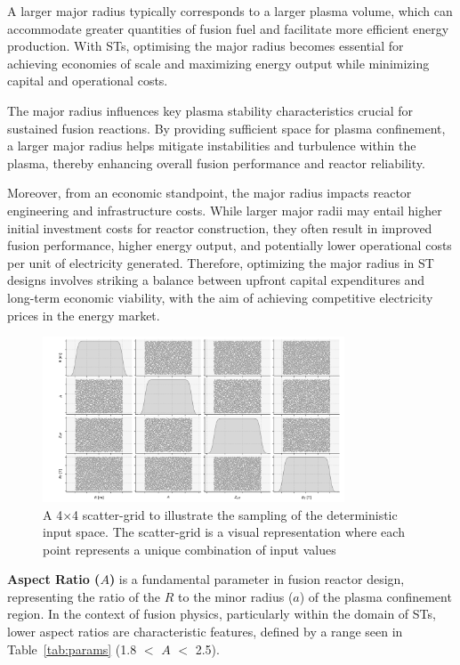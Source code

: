 \documentclass[journal]{IEEEtran}
\begin{document}
A larger major radius typically corresponds to a larger plasma volume, which can accommodate greater quantities of fusion fuel and facilitate more efficient energy production. With STs, optimising the major radius becomes essential for achieving economies of scale and maximizing energy output while minimizing capital and operational costs.

The major radius influences key plasma stability characteristics crucial for sustained fusion reactions. By providing sufficient space for plasma confinement, a larger major radius helps mitigate instabilities and turbulence within the plasma, thereby enhancing overall fusion performance and reactor reliability.

Moreover, from an economic standpoint, the major radius impacts reactor engineering and infrastructure costs. While larger major radii may entail higher initial investment costs for reactor construction, they often result in improved fusion performance, higher energy output, and potentially lower operational costs per unit of electricity generated. Therefore, optimizing the major radius in ST designs involves striking a balance between upfront capital expenditures and long-term economic viability, with the aim of achieving competitive electricity prices in the energy market.

\begin{figure}[t]
    \centering
    \includegraphics[width=0.8\textwidth]{figures/TE_results/4x4scatter_inputs_marchdata.png}
    \caption{\small A 4$\times$4 scatter-grid to illustrate the sampling of the deterministic input space. The scatter-grid is a visual representation where each point represents a unique combination of input values}\label{fig:scatter_sampling}
\end{figure}

\textbf{Aspect Ratio ($A$)} is a fundamental parameter in fusion reactor design, representing the ratio of the $R$ to the minor radius ($a$) of the plasma confinement region. In the context of fusion physics, particularly within the domain of STs, lower aspect ratios are characteristic features, defined by a range seen in Table~\ref{tab:params} (1.8 $<$ $A$ $<$ 2.5).
\end{document}
